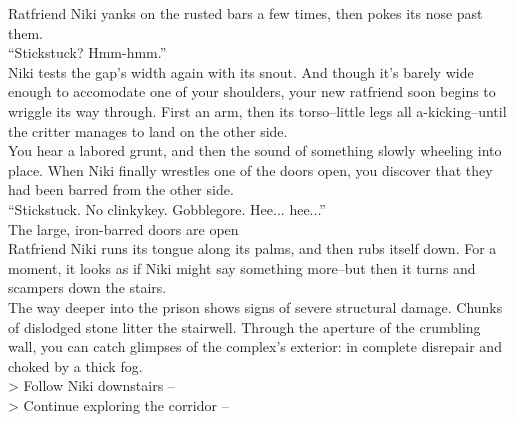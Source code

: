 Ratfriend Niki yanks on the rusted bars a few times, then pokes its nose past them.\\

“Stickstuck? Hmm-hmm.”\\

Niki tests the gap’s width again with its snout. And though it’s barely wide enough to accomodate one of your shoulders, your new ratfriend soon begins to wriggle its way through. First an arm, then its torso--little legs all a-kicking--until the critter manages to land on the other side.\\

You hear a labored grunt, and then the sound of something slowly wheeling into place. When Niki finally wrestles one of the doors open, you discover that they had been barred from the other side.\\

“Stickstuck. No clinkykey. Gobblegore. Hee... hee...”\\
 The large, iron-barred doors are open\\

Ratfriend Niki runs its tongue along its palms, and then rubs itself down. For a moment, it looks as if Niki might say something more--but then it turns and scampers down the stairs.\\

The way deeper into the prison shows signs of severe structural damage. Chunks of dislodged stone litter the stairwell. Through the aperture of the crumbling wall, you can catch glimpses of the complex’s exterior: in complete disrepair and choked by a thick fog.\\

> Follow Niki downstairs -- \\
> Continue exploring the corridor -- 